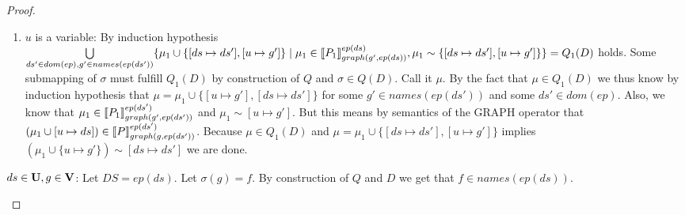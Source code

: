 \begin{proof}
\begin{enumerate}
\begin{enumerate}
				\item $u$ is a variable: By induction hypothesis
					$\bigcup\limits_{ds' \in dom(ep), g' \in names(ep(ds'))} \{
						\mu_1 \cup \{[ds \mapsto ds'],[u \mapsto g']\} \mid \mu_1 \in
						\llbracket P_1\rrbracket^{ep(ds)}_{graph(g',ep(ds))}, 
						\mu_1 \sim
					\{[ds \mapsto ds'], [u \mapsto g']\}\} = Q_1(D) $  
					holds.  Some submapping of $\sigma$ must fulfill $Q_1(D)$ by
					construction of $Q$ and $\sigma \in Q(D)$. Call it $\mu$.
					By the fact that $\mu \in Q_1(D)$ we thus know by induction
					hypothesis that
					$\mu = \mu_1 \cup \{[u \mapsto g'],[ds \mapsto ds']\}$
					for some $g' \in names(ep(ds'))$ 
					and some $ds' \in dom(ep)$. Also, we know that $\mu_1 \in \llbracket P_1
					\rrbracket^{ep(ds')}_{graph(g',ep(ds'))}$ and $\mu_1 \sim
					[u\mapsto g']$.
					But this means by semantics of the GRAPH operator that
					$(\mu_1\cup[u\mapsto ds]) \in \llbracket P
					\rrbracket^{ep(ds')}_{graph(g,ep(ds'))}$.
					Because $\mu \in Q_1(D)$ and $\mu = \mu_1
					\cup \{ [ds \mapsto ds'],
					[u \mapsto g'] \}$ implies
					$(\mu_1\cup\{u \mapsto g'\}) \sim   [ds
					\mapsto ds']$ we are done.  
			\end{enumerate}

			\bigskip\noindent
			$ds \in \mathbf{U},g \in \mathbf{V}$: Let $DS = ep(ds)$.
			Let $\sigma(g) = f$.  By construction of $Q$ and $D$ we
			get that $f \in names(ep(ds))$.


\end{enumerate}
\end{proof}
